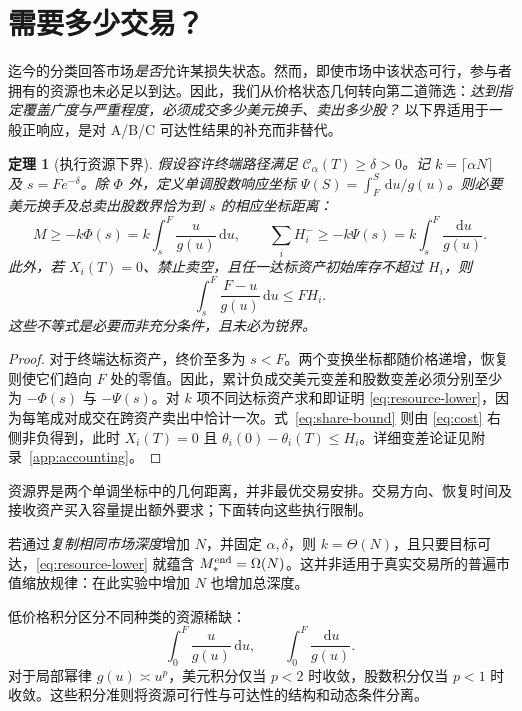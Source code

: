 \documentclass[11pt]{article}
\numberwithin{equation}{section}
\newtheorem{theorem}{定理}[section]
\theoremstyle{definition}
\theoremstyle{remark}
\newcommand{\Cris}{\mathcal{C}}
\newcommand{\dd}{\,\mathrm{d}}
\begin{document}
\section{需要多少交易？}\label{sec:budget}
迄今的分类回答市场\emph{是否}允许某损失状态。然而，即使市场中该状态可行，参与者拥有的资源也未必足以到达。因此，我们从价格状态几何转向第二道筛选：\emph{达到指定覆盖广度与严重程度，必须成交多少美元换手、卖出多少股？} 以下界适用于一般正响应，是对 A/B/C 可达性结果的补充而非替代。

\begin{theorem}[执行资源下界]\label{thm:resource}
假设容许终端路径满足 $\Cris_\alpha(T)\ge\delta>0$。记 $k=\lceil\alpha N\rceil$ 及 $s=Fe^{-\delta}$。除 $\Phi$ 外，定义单调股数响应坐标 $\Psi(S)=\int_F^S\dd u/g(u)$。则必要美元换手及总卖出股数界恰为到 $s$ 的相应坐标距离：
\begin{equation}\label{eq:resource-lower}
\boxed{M\ge -k\Phi(s)=k\int_s^F\frac{u}{g(u)}\dd u,\qquad
\sum_iH_i^-\ge -k\Psi(s)=k\int_s^F\frac{\dd u}{g(u)}.}
\end{equation}
此外，若 $X_i(T)=0$、禁止卖空，且任一达标资产初始库存不超过 $H_i$，则
\begin{equation}\label{eq:share-bound}
\boxed{\int_s^F\frac{F-u}{g(u)}\dd u\le FH_i.}
\end{equation}
这些不等式是必要而非充分条件，且未必为锐界。
\end{theorem}
\begin{proof}
对于终端达标资产，终价至多为 $s<F$。两个变换坐标都随价格递增，恢复则使它们趋向 $F$ 处的零值。因此，累计负成交美元变差和股数变差必须分别至少为 $-\Phi(s)$ 与 $-\Psi(s)$。对 $k$ 项不同达标资产求和即证明 \eqref{eq:resource-lower}，因为每笔成对成交在跨资产卖出中恰计一次。式~\eqref{eq:share-bound} 则由 \eqref{eq:cost} 右侧非负得到，此时 $X_i(T)=0$ 且 $\theta_i(0)-\theta_i(T)\le H_i$。详细变差论证见附录~\ref{app:accounting}。
\end{proof}

资源界是两个单调坐标中的几何距离，并非最优交易安排。交易方向、恢复时间及接收资产买入容量提出额外要求；下面转向这些执行限制。

若通过\emph{复制相同市场深度}增加 $N$，并固定 $\alpha,\delta$，则 $k=\Theta(N)$，且只要目标可达，\eqref{eq:resource-lower} 就蕴含 $M_*^{\rm end}=\Omega(N)$。这并非适用于真实交易所的普遍市值缩放规律：在此实验中增加 $N$ 也增加总深度。

低价格积分区分不同种类的资源稀缺：
\begin{equation}\label{eq:lowprice}
\int_0^F\frac{u}{g(u)}\dd u,\qquad
\int_0^F\frac{\dd u}{g(u)}.
\end{equation}
对于局部幂律 $g(u)\asymp u^p$，美元积分仅当 $p<2$ 时收敛，股数积分仅当 $p<1$ 时收敛。这些积分准则将资源可行性与可达性的结构和动态条件分离。
\end{document}
